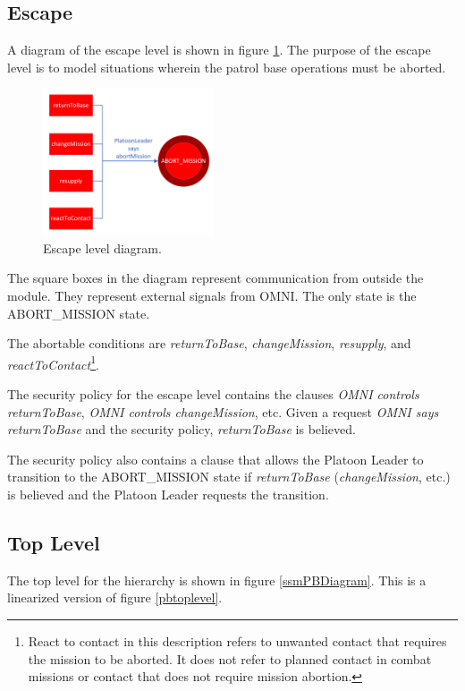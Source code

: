 \documentclass[../../main/main.tex]{subfiles}
\begin{document}
\subsection{Escape}\label{ssec:escape}
A diagram of the escape level is shown in figure \ref{escapeDiagram}.  The purpose of the escape level is to model situations wherein the patrol base operations must be aborted.  

\begin{figure}[h!]
\centering
\includegraphics[width=0.45\textwidth]{../figures/escapeDiagram}
\caption{\label{escapeDiagram} Escape level diagram.}
\end{figure}

The square boxes in the diagram represent communication from outside the module.  They represent external signals from OMNI.  The only state is the ABORT_MISSION state. 

The abortable conditions are \textit{returnToBase}, \textit{changeMission}, \textit{resupply}, and \textit{reactToContact}\footnote{React to contact in this description refers to unwanted contact that requires the mission to be aborted.  It does not refer to planned contact in combat missions or contact that does not require mission abortion.}.  


The security policy for the escape level contains the clauses \textit{OMNI controls returnToBase}, \textit{OMNI controls changeMission}, etc.  Given a request \textit{OMNI says returnToBase} and the security policy, \textit{returnToBase} is believed.  

The security policy also contains a clause that allows the Platoon Leader to transition to the ABORT_MISSION state if \textit{returnToBase} (\textit{changeMission}, etc.)  is believed and the Platoon Leader requests the transition.


 \clearpage

\subsection{Top Level}\label{ssec:toplevel}
The top level for the hierarchy is shown in figure \ref{ssmPBDiagram}.  This is a linearized version of figure \ref{pbtoplevel}.
\end{document}
